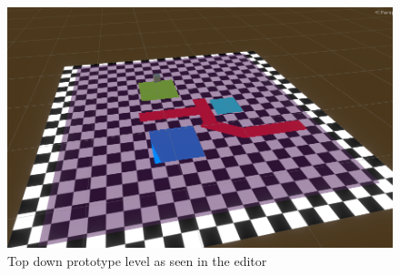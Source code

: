 \begin{figure}[p]
  \centering
  \includegraphics[width=\imgWidth]{images/workflow/TopDownLevel.png}
  \caption{Top down prototype level as seen in the editor}
  \label{TopDownUnity}
\end{figure}

